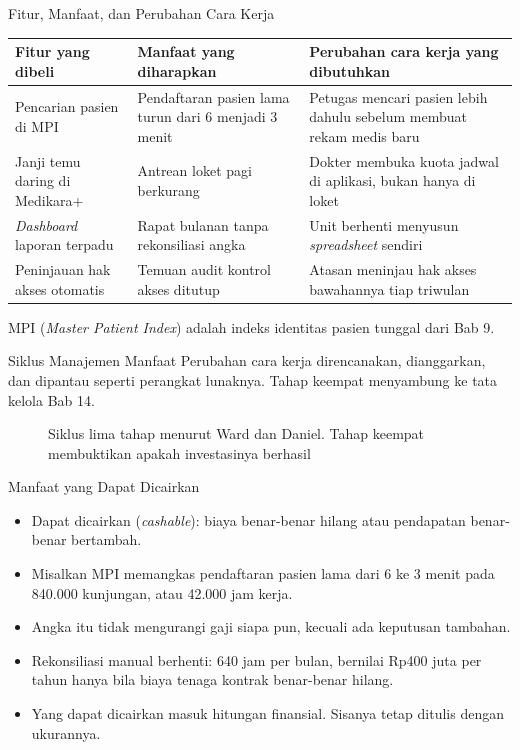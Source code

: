 \documentclass[aspectratio=169, table, 12pt]{beamer}
\begin{document}
\begin{frame}{{\Large Fitur, Manfaat, dan Perubahan Cara Kerja}}
  \footnotesize
  \begin{tabularx}{\textwidth}{YYY}
    \hline
    \textbf{Fitur yang dibeli} & \textbf{Manfaat yang diharapkan} &
      \textbf{Perubahan cara kerja yang dibutuhkan} \\
    \hline
    Pencarian pasien di MPI & Pendaftaran pasien lama turun dari 6 menjadi
      3 menit & Petugas mencari pasien lebih dahulu sebelum membuat rekam
      medis baru \\
    \hline
    Janji temu daring di Medikara+ & Antrean loket pagi berkurang & Dokter
      membuka kuota jadwal di aplikasi, bukan hanya di loket \\
    \hline
    \textit{Dashboard} laporan terpadu & Rapat bulanan tanpa rekonsiliasi angka
      & Unit berhenti menyusun \textit{spreadsheet} sendiri \\
    \hline
    Peninjauan hak akses otomatis & Temuan audit kontrol akses ditutup &
      Atasan meninjau hak akses bawahannya tiap triwulan \\
    \hline
  \end{tabularx}

  \vspace{6pt}
  \small MPI (\textit{Master Patient Index}) adalah indeks identitas pasien tunggal dari Bab 9.
\end{frame}

\begin{frame}{{\Large Siklus Manajemen Manfaat}}
  \small Perubahan cara kerja direncanakan, dianggarkan, dan dipantau seperti perangkat lunaknya.
  Tahap keempat menyambung ke tata kelola Bab 14.

  \centering
  \begin{figure}
    \resizebox{0.94\textwidth}{!}{}
    \caption{Siklus lima tahap menurut Ward dan Daniel. Tahap keempat membuktikan apakah investasinya
             berhasil}
  \end{figure}
\end{frame}

\begin{frame}{{\Large Manfaat yang Dapat Dicairkan}}
  \small
  \vspace{4pt}
  \begin{itemize}
    \item Dapat dicairkan (\textit{cashable}): biaya benar-benar hilang atau pendapatan benar-benar
          bertambah.
    \item Misalkan MPI memangkas pendaftaran pasien lama dari 6 ke 3 menit pada 840.000 kunjungan, atau
          42.000 jam kerja.
    \item Angka itu tidak mengurangi gaji siapa pun, kecuali ada keputusan tambahan.
    \item Rekonsiliasi manual berhenti: 640 jam per bulan, bernilai Rp400 juta per tahun hanya bila
          biaya tenaga kontrak benar-benar hilang.
    \item Yang dapat dicairkan masuk hitungan finansial. Sisanya tetap ditulis dengan ukurannya.
  \end{itemize}
\end{frame}
\end{document}
